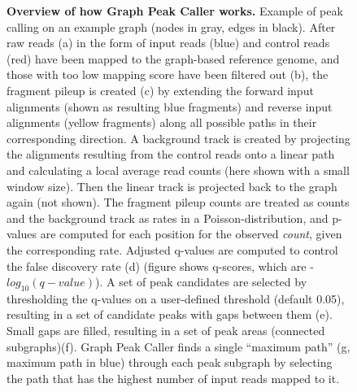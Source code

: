 \documentclass[10pt,letterpaper]{article}
\begin{document}
\begin{figure}

 
    \caption{{\bf Overview of how Graph Peak Caller works.} Example of peak calling on an example graph (nodes in gray, edges in black). After raw reads (a) in the form of input reads (blue) and control reads (red) have been mapped to the graph-based reference genome, and those with too low mapping score have been filtered out (b), the fragment pileup is created (c) by extending the forward input alignments (shown as resulting blue fragments) and reverse input alignments (yellow fragments) along all possible paths in their corresponding direction. A background track is created by projecting the alignments resulting from the control reads onto a linear path and calculating a local average  read counts (here shown with a small window size). Then the linear track is projected back to the graph again (not shown). The fragment pileup counts are treated as counts and the background track as rates in a Poisson-distribution, and p-values are computed for each position for the observed \emph{count}, given the corresponding rate. Adjusted q-values are computed to control the false discovery rate (d) (figure shows q-scores, which are -$log_{10}(q-value)$). A set of peak candidates are selected by thresholding the q-values on a user-defined threshold (default 0.05), resulting in a set of candidate peaks with gaps between them (e). Small gaps are filled, resulting in a set of peak areas (connected subgraphs)(f). Graph Peak Caller finds a single “maximum path” (g, maximum path in blue) through each peak subgraph by selecting the path that has the highest number of input reads mapped to it. }
   \label{overview_figure}



\end{figure}
\end{document}

